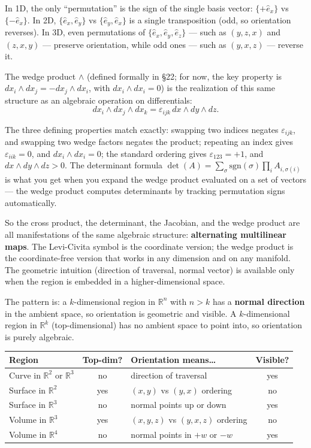 \documentclass[11pt]{report}
\newcommand{\R}{\mathbb{R}}
\begin{document}
In 1D, the only ``permutation'' is the sign of the single basis vector: $\{+\hat{e}_x\}$ vs $\{-\hat{e}_x\}$. In 2D, $\{\hat{e}_x, \hat{e}_y\}$ vs $\{\hat{e}_y, \hat{e}_x\}$ is a single transposition (odd, so orientation reverses). In 3D, even permutations of $\{\hat{e}_x, \hat{e}_y, \hat{e}_z\}$ --- such as $(y,z,x)$ and $(z,x,y)$ --- preserve orientation, while odd ones --- such as $(y,x,z)$ --- reverse it.

The wedge product $\wedge$ (defined formally in \S22; for now, the key property is $dx_i \wedge dx_j = -dx_j \wedge dx_i$, with $dx_i \wedge dx_i = 0$) is the realization of this same structure as an algebraic operation on differentials:
\[
dx_i \wedge dx_j \wedge dx_k = \varepsilon_{ijk}\,dx \wedge dy \wedge dz.
\]

The three defining properties match exactly: swapping two indices negates $\varepsilon_{ijk}$, and swapping two wedge factors negates the product; repeating an index gives $\varepsilon_{iik} = 0$, and $dx_i \wedge dx_i = 0$; the standard ordering gives $\varepsilon_{123} = +1$, and $dx \wedge dy \wedge dz > 0$. The determinant formula $\det(A) = \sum_\sigma \mathrm{sgn}(\sigma)\prod_i A_{i,\sigma(i)}$ is what you get when you expand the wedge product evaluated on a set of vectors --- the wedge product computes determinants by tracking permutation signs automatically.

So the cross product, the determinant, the Jacobian, and the wedge product are all manifestations of the same algebraic structure: \textbf{alternating multilinear maps}. The Levi-Civita symbol is the coordinate version; the wedge product is the coordinate-free version that works in any dimension and on any manifold. The geometric intuition (direction of traversal, normal vector) is available only when the region is embedded in a higher-dimensional space.

The pattern is: a $k$-dimensional region in $\R^n$ with $n > k$ has a \textbf{normal direction} in the ambient space, so orientation is geometric and visible. A $k$-dimensional region in $\R^k$ (top-dimensional) has no ambient space to point into, so orientation is purely algebraic.

\begin{center}
\renewcommand{\arraystretch}{1.4}
\begin{tabular}{|l|c|l|c|}
\hline
\textbf{Region} & \textbf{Top-dim?} & \textbf{Orientation means\ldots} & \textbf{Visible?} \\
\hline
Curve in $\R^2$ or $\R^3$ & no & direction of traversal & yes \\
\hline
Surface in $\R^2$ & yes & $(x,y)$ vs $(y,x)$ ordering & no \\
\hline
Surface in $\R^3$ & no & normal points up or down & yes \\
\hline
Volume in $\R^3$ & yes & $(x,y,z)$ vs $(y,x,z)$ ordering & no \\
\hline
Volume in $\R^4$ & no & normal points in $+w$ or $-w$ & yes \\
\hline
\end{tabular}
\end{center}
\end{document}
